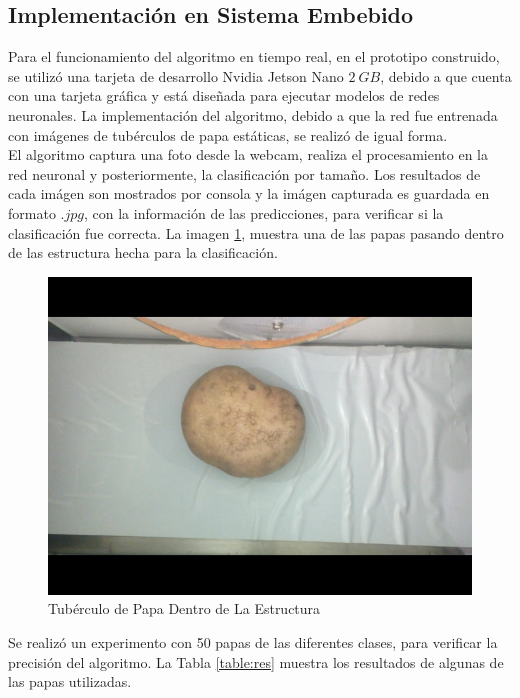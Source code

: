 \subsection{Implementación en Sistema Embebido}

Para el funcionamiento del algoritmo en tiempo real, en el prototipo construido, se utilizó una tarjeta de desarrollo Nvidia Jetson Nano $2 \ GB$, debido a que cuenta con una tarjeta gráfica y está diseñada para ejecutar modelos de redes neuronales. La implementación del algoritmo, debido a que la red fue entrenada con imágenes de tubérculos de papa estáticas, se realizó de igual forma.\\

El algoritmo captura una foto desde la webcam, realiza el procesamiento en la red neuronal y posteriormente, la clasificación por tamaño. Los resultados de cada imágen son mostrados por consola y la imágen capturada es guardada en formato $.jpg$, con la información de las predicciones, para verificar si la clasificación fue correcta. La imagen \ref{fig:implementacion}, muestra una de las papas pasando dentro de las estructura hecha para la clasificación.

\begin{figure}[ht]
	\centering
	\includegraphics[scale=0.25]{Figs/implementacion.jpg}
	\caption{Tubérculo de Papa Dentro de La Estructura}
	\label{fig:implementacion}
\end{figure}

Se realizó un experimento con 50 papas de las diferentes clases, para verificar la precisión del algoritmo. La Tabla \ref{table:res} muestra los resultados de algunas de las papas utilizadas.

